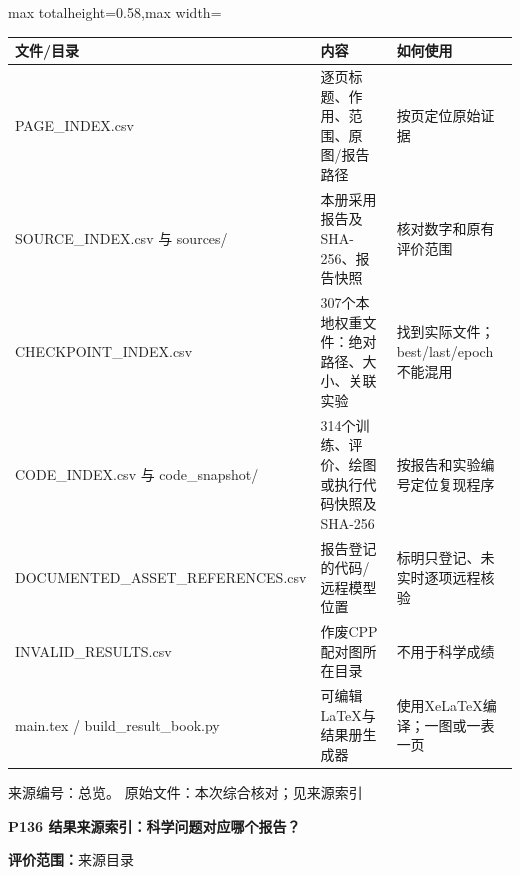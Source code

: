 \documentclass[UTF8,a4paper,landscape,10pt]{ctexart}
\begin{document}
\begin{center}\small
\begin{adjustbox}{max totalheight=0.58\textheight,max width=\linewidth}
\begin{minipage}{\linewidth}\begin{tabularx}{\linewidth}{>{\hsize=1.0000\hsize\raggedright\arraybackslash}X>{\hsize=1.0000\hsize\raggedright\arraybackslash}X>{\hsize=1.0000\hsize\raggedright\arraybackslash}X}\toprule
\textbf{文件/\allowbreak{}目录} & \textbf{内容} & \textbf{如何使用} \\ \midrule
PAGE\_\allowbreak{}INDEX.csv & 逐页标题、作用、范围、原图/\allowbreak{}报告路径 & 按页定位原始证据 \\
SOURCE\_\allowbreak{}INDEX.csv 与 sources/\allowbreak{} & 本册采用报告及SHA-256、报告快照 & 核对数字和原有评价范围 \\
CHECKPOINT\_\allowbreak{}INDEX.csv & 307个本地权重文件：绝对路径、大小、关联实验 & 找到实际文件；best/\allowbreak{}last/\allowbreak{}epoch不能混用 \\
CODE\_\allowbreak{}INDEX.csv 与 code\_\allowbreak{}snapshot/\allowbreak{} & 314个训练、评价、绘图或执行代码快照及SHA-256 & 按报告和实验编号定位复现程序 \\
DOCUMENTED\_\allowbreak{}ASSET\_\allowbreak{}REFERENCES.csv & 报告登记的代码/\allowbreak{}远程模型位置 & 标明只登记、未实时逐项远程核验 \\
INVALID\_\allowbreak{}RESULTS.csv & 作废CPP配对图所在目录 & 不用于科学成绩 \\
main.tex /\allowbreak{} build\_\allowbreak{}result\_\allowbreak{}book.py & 可编辑LaTeX与结果册生成器 & 使用XeLaTeX编译；一图或一表一页 \\
\bottomrule\end{tabularx}\end{minipage}\end{adjustbox}\end{center}
\vfill{\scriptsize\color{muted} 来源编号：总览。 原始文件：本次综合核对；见来源索引}\par
\clearpage
{\large\bfseries\color{ink} P136  结果来源索引：科学问题对应哪个报告？}\par
{}\par
{\small\color{muted}\textbf{评价范围：}来源目录}\par\vspace{3mm}
\end{document}
